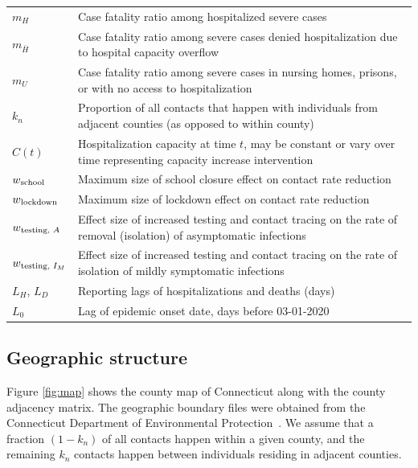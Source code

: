 \documentclass[11pt]{article}
\begin{document}
\begin{table}[!htb]
\begin{tabular}{p{} p{} }
	$m_H$ & Case fatality ratio among hospitalized severe cases \\[0.5em]
	$m_{\bar{H}}$ & Case fatality ratio among severe cases denied hospitalization due to hospital capacity overflow \\[0.5em]
	$m_{U}$ & Case fatality ratio among severe cases in nursing homes, prisons, or with no access to hospitalization \\[0.5em]
	$k_n$ & Proportion of all contacts that happen with individuals from adjacent counties (as opposed to within county) \\[0.5em]
	$C(t)$ & Hospitalization capacity at time $t$, may be constant or vary over time representing capacity increase intervention \\[0.5em]
	$w\textsubscript{school}$ & Maximum size of school closure effect on contact rate reduction \\[0.5em]
	$w\textsubscript{lockdown}$ & Maximum size of lockdown effect on contact rate reduction \\[0.5em]
	$w\textsubscript{testing, $A$}$ & Effect size of increased testing and contact tracing on the rate of removal (isolation) of asymptomatic infections \\[0.5em]
	$w\textsubscript{testing, $I_M$}$ & Effect size of increased testing and contact tracing on the rate of isolation of mildly symptomatic infections \\[0.5em]
	$L_H$, $L_D$ & Reporting lags of hospitalizations and deaths (days) \\[0.5em]
	$L_0$ & Lag of epidemic onset date, days before 03-01-2020 \\[0.5em]
	\hline
	\end{tabular}
	\label{table:params}
\end{table}
\endgroup

\subsection{Geographic structure}

Figure \ref{fig:map} shows the county map of Connecticut along with the county adjacency matrix. The geographic boundary files were obtained from the Connecticut Department of Environmental Protection~\citep{shapefile}. We assume that a fraction $(1-k_n)$ of all contacts happen within a given county, and the remaining $k_n$ contacts happen between individuals residing in adjacent counties.
\end{document}
